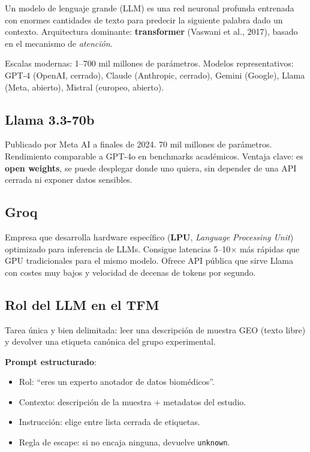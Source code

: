 \documentclass[11pt, a4paper]{article}
\begin{document}
Un modelo de lenguaje grande (LLM) es una red neuronal profunda
entrenada con enormes cantidades de texto para predecir la siguiente
palabra dado un contexto. Arquitectura dominante: \textbf{transformer}
(Vaswani et al., 2017), basado en el mecanismo de \emph{atenci\'on}.

Escalas modernas: 1--700 mil millones de par\'ametros. Modelos
representativos: GPT-4 (OpenAI, cerrado), Claude (Anthropic, cerrado),
Gemini (Google), Llama (Meta, abierto), Mistral (europeo, abierto).

\subsection{Llama 3.3-70b}

Publicado por Meta AI a finales de 2024. 70 mil millones de par\'ametros.
Rendimiento comparable a GPT-4o en benchmarks acad\'emicos. Ventaja
clave: es \textbf{open weights}, se puede desplegar donde uno quiera,
sin depender de una API cerrada ni exponer datos sensibles.

\subsection{Groq}

Empresa que desarrolla hardware espec\'ifico (\textbf{LPU},
\emph{Language Processing Unit}) optimizado para inferencia de LLMs.
Consigue latencias 5--10$\times$ m\'as r\'apidas que GPU tradicionales
para el mismo modelo. Ofrece API p\'ublica que sirve Llama con costes
muy bajos y velocidad de decenas de tokens por segundo.

\subsection{Rol del LLM en el TFM}

Tarea \'unica y bien delimitada: leer una descripci\'on de muestra GEO
(texto libre) y devolver una etiqueta can\'onica del grupo experimental.

\textbf{Prompt estructurado}:
\begin{itemize}[leftmargin=1.2em]
  \item Rol: ``eres un experto anotador de datos biom\'edicos''.
  \item Contexto: descripci\'on de la muestra + metadatos del estudio.
  \item Instrucci\'on: elige entre lista cerrada de etiquetas.
  \item Regla de escape: si no encaja ninguna, devuelve \texttt{unknown}.
\end{itemize}
\end{document}
